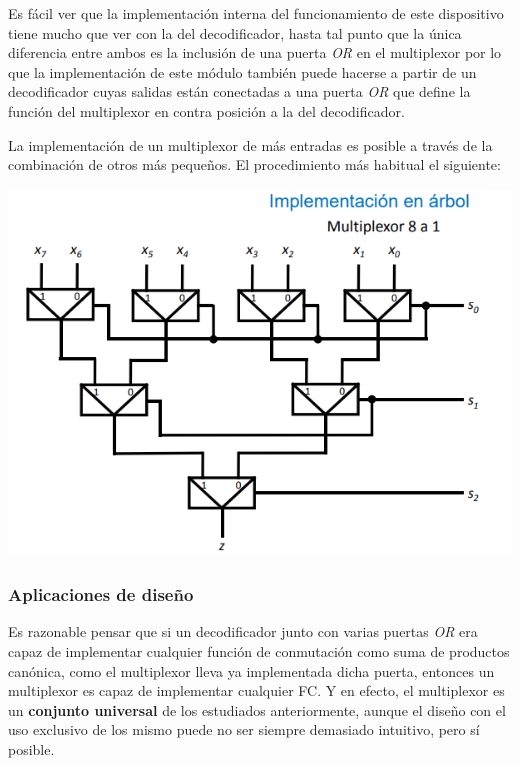 \documentclass[a4paper,10pt]{book}
\begin{document}
Es fácil ver que la implementación interna del funcionamiento de este dispositivo tiene mucho que ver con la del decodificador, hasta tal punto que la única diferencia entre ambos es la inclusión de una puerta \textit{OR} en el multiplexor por lo que la implementación de este módulo también puede hacerse a partir de un decodificador cuyas salidas están conectadas a una puerta \textit{OR} que define la función del multiplexor en contra posición a la del decodificador.\par

La implementación de un multiplexor de más entradas es posible a través de la combinación de otros más pequeños. El procedimiento más habitual el siguiente:
\begin{center}
\includegraphics[scale=0.75]{arbol multiplexor}
\end{center}

\subsubsection*{Aplicaciones de diseño}
Es razonable pensar que si un decodificador junto con varias puertas \textit{OR} era capaz de implementar cualquier función de conmutación como suma de productos canónica, como el multiplexor lleva ya implementada dicha puerta, entonces un multiplexor es capaz de implementar cualquier FC. Y en efecto, el multiplexor es un \textbf{conjunto universal} de los estudiados anteriormente, aunque el diseño con el uso exclusivo de los mismo puede no ser siempre demasiado intuitivo, pero sí posible.\par
\end{document}
